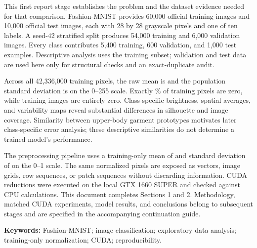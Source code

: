 \documentclass[11pt,a4paper]{article}
\begin{document}
This first report stage establishes the problem and the dataset evidence needed
for that comparison. Fashion-MNIST provides 60,000 official training images and
10,000 official test images, each with 28 by 28 grayscale pixels and one of ten
labels. A seed-42 stratified split produces 54,000 training and 6,000 validation
images. Every class contributes 5,400 training, 600 validation, and 1,000 test
examples. Descriptive analysis uses the training subset; validation and test data
are used here only for structural checks and an exact-duplicate audit.

Across all 42,336,000 training pixels, the raw mean is \RawMean{} and the population
standard deviation is \RawStd{} on the 0--255 scale. Exactly \ZeroPercent\% of
training pixels are zero, while \BlankImages{} training images are entirely zero.
Class-specific brightness, spatial averages, and variability maps reveal
substantial differences in silhouette and image coverage. Similarity between
upper-body garment prototypes motivates later class-specific error analysis;
these descriptive similarities do not determine a trained model's performance.

The preprocessing pipeline uses a training-only mean of \TrainMean{} and
standard deviation of \TrainStd{} on the 0--1 scale. The same normalized pixels
are exposed as vectors, image grids, row sequences, or patch sequences without
discarding information. CUDA reductions were executed on the local GTX 1660 SUPER
and checked against CPU calculations. This document completes Sections 1 and 2.
Methodology, matched CUDA experiments, model results, and conclusions belong to
subsequent stages and are specified in the accompanying continuation guide.

\vspace{.4em}
\textbf{Keywords:} Fashion-MNIST; image classification; exploratory data analysis;
training-only normalization; CUDA; reproducibility.

\clearpage
\tableofcontents
\clearpage
{}


\clearpage

\end{document}

